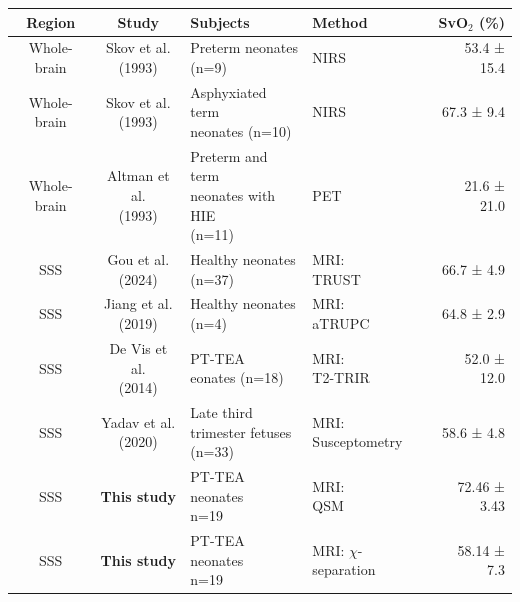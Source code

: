 \documentclass[
true
]{sn-jnl}
\begin{document}
\begin{ThreePartTable}
\begin{longtable}[t]{ccllr}
\toprule
Region & Study & Subjects & Method & SvO$_{2}$ (\%)\\
\midrule
Whole-brain & \makecell[l]{Skov et al. \\(1993)    } & \makecell[l]{Preterm neonates \\(n=9)                   } & NIRS & 53.4 ± 15.4\\
Whole-brain & \makecell[l]{Skov et al. \\(1993)    } & \makecell[l]{Asphyxiated term \\neonates (n=10)           } & NIRS & 67.3 ± 9.4\\
Whole-brain & \makecell[l]{Altman et al. \\(1993)    } & \makecell[l]{Preterm and term \\neonates with HIE \\(n=11)} & PET & 21.6 ± 21.0\\
SSS & \makecell[l]{Gou et al. \\(2024)     } & \makecell[l]{Healthy neonates \\(n=37)                    } & \makecell[l]{MRI: \\TRUST   } & 66.7 ± 4.9\\
SSS & \makecell[l]{Jiang et al. \\(2019)   } & \makecell[l]{Healthy neonates \\(n=4)                     } & \makecell[l]{MRI: \\aTRUPC  } & 64.8 ± 2.9\\
SSS & \makecell[l]{De Vis et al. \\(2014)  } & \makecell[l]{PT-TEA \\eonates (n=18)                      } & \makecell[l]{MRI: \\T2-TRIR } & 52.0 ± 12.0\\
SSS & \makecell[l]{Yadav et al. \\(2020)} & \makecell[l]{Late third \\trimester fetuses \\(n=33)} & \makecell[l]{MRI: \\Susceptometry} & 58.6 ± 4.8\\
SSS & \textbf{This study} & \makecell[l]{PT-TEA \\neonates \\n=19} & \makecell[l]{MRI: \\QSM} & 72.46 ± 3.43\\
SSS & \textbf{This study} & \makecell[l]{PT-TEA \\neonates \\n=19} & \makecell[l]{MRI: \\$\chi$-separation} & 58.14 ± 7.3\\

\end{longtable}
\end{ThreePartTable}
\end{document}
